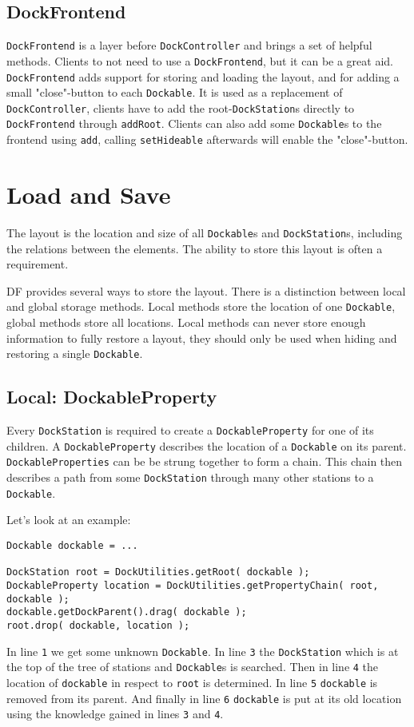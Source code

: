 \documentclass[a4paper,10pt]{article}
\newcommand{\src}[1]{\lstinline[basicstyle=\ttfamily]|#1|}
\begin{document}
\subsection{DockFrontend}
\src{DockFrontend} is a layer before \src{DockController} and brings a set of helpful methods. Clients to not need to use a  \src{DockFrontend}, but it can be a great aid. \src{DockFrontend} adds support for storing and loading the layout, and for adding a small "close"-button to each \src{Dockable}. It is used as a replacement of \src{DockController}, clients have to add the root-\src{DockStation}s directly to \src{DockFrontend} through \src{addRoot}. Clients can also add some \src{Dockable}s to the frontend using \src{add}, calling \src{setHideable} afterwards will enable the "close"-button.

\section{Load and Save}
The layout is the location and size of all \src{Dockable}s and \src{DockStation}s, including the relations between the elements. The ability to store this layout is often a requirement. 

DF provides several ways to store the layout. There is a distinction between local and global storage methods. Local methods store the location of one \src{Dockable}, global methods store all locations. Local methods can never store enough information to fully restore a layout, they should only be used when hiding and restoring a single \src{Dockable}.

\subsection{Local: DockableProperty}
Every \src{DockStation} is required to create a \src{DockableProperty} for one of its children. A \src{DockableProperty} describes the location of a \src{Dockable} on its parent. \src{DockableProperties} can be be strung together to form a chain. This chain then describes a path from some \src{DockStation} through many other stations to a \src{Dockable}.

Let's look at an example:
\begin{lstlisting}
Dockable dockable = ...

DockStation root = DockUtilities.getRoot( dockable );
DockableProperty location = DockUtilities.getPropertyChain( root, dockable );
dockable.getDockParent().drag( dockable );
root.drop( dockable, location );
\end{lstlisting}
In line \src{1} we get some unknown \src{Dockable}. In line \src{3} the \src{DockStation} which is at the top of the tree of stations and \src{Dockable}s is searched. Then in line \src{4} the location of \src{dockable} in respect to \src{root} is determined. In line \src{5} \src{dockable} is removed from its parent. And finally in line \src{6} \src{dockable} is put at its old location using the knowledge gained in lines \src{3} and \src{4}.
\end{document}
